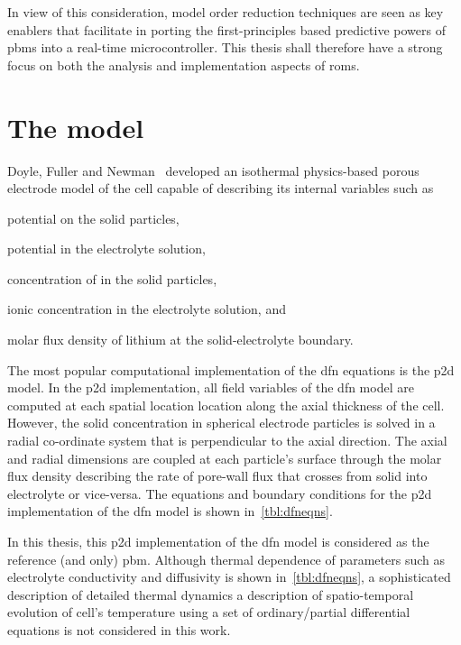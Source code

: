 In view of this consideration, model  order reduction techniques are seen as key
enablers that facilitate in porting the first-principles based predictive powers
of \glspl{pbm}  into a  real-time microcontroller.  This thesis  shall therefore
have  a  strong  focus  on  both the  analysis  and  implementation  aspects  of
\glspl{rom}.

\section{The  model}
Doyle, Fuller and Newman~\cite{Doyle1993}  developed an isothermal physics-based
porous electrode model of the cell  capable of describing its internal variables
such as
\begin{enumerate*}[label=\itshape\alph*\upshape)]
    \item potential on the solid particles,
    \item potential in the electrolyte solution,
    \item concentration of  in the solid particles,
    \item ionic concentration in the electrolyte solution, and
    \item molar flux density of lithium at the solid-electrolyte boundary.
\end{enumerate*}
The most popular computational implementation  of the \gls{dfn} equations is the
\gls{p2d} model.  In the  \gls{p2d} implementation, all  field variables  of the
\gls{dfn} model are  computed at each spatial location location  along the axial
thickness of the  cell. However, the solid concentration  in spherical electrode
particles is solved in a radial  co-ordinate system that is perpendicular to the
axial direction. The axial and radial  dimensions are coupled at each particle's
surface through  the molar flux  density describing  the rate of  pore-wall flux
that  crosses from  solid  into  electrolyte or  vice-versa.  The equations  and
boundary conditions for  the \gls{p2d} implementation of the  \gls{dfn} model is
shown in~\cref{tbl:dfneqns}.



In  this  thesis,  this  \gls{p2d}  implementation of  the  \gls{dfn}  model  is
considered as  the reference (and  only) \gls{pbm}. Although  thermal dependence
of  parameters  such  as  electrolyte  conductivity  and  diffusivity  is  shown
in~\cref{tbl:dfneqns}, a sophisticated description  of detailed thermal dynamics
\ie{} a description  of spatio-temporal evolution of cell's  temperature using a
set of ordinary/partial  differential equations is not considered  in this work.

